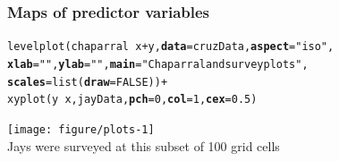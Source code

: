 \documentclass[color=usenames,dvipsnames]{beamer}\usepackage[]{graphicx}\usepackage[]{color}
\makeatletter
\newcommand{\hlnum}[1]{\textcolor[rgb]{0.69,0.494,0}{#1}}%
\newcommand{\hlstr}[1]{\textcolor[rgb]{0.749,0.012,0.012}{#1}}%
\newcommand{\hlopt}[1]{\textcolor[rgb]{0,0,0}{#1}}%
\newcommand{\hlstd}[1]{\textcolor[rgb]{0,0,0}{#1}}%
\newcommand{\hlkwc}[1]{\textcolor[rgb]{0,0,0}{\textbf{#1}}}%
\newcommand{\hlkwd}[1]{\textcolor[rgb]{0.004,0.004,0.506}{#1}}%
\newenvironment{kframe}{%
 \def\at@end@of@kframe{}%
 \ifinner\ifhmode%
  \def\at@end@of@kframe{\end{minipage}}%
  \begin{minipage}{\columnwidth}%
 \fi\fi%
 \def\FrameCommand##1{\hskip\@totalleftmargin \hskip-\fboxsep
 \colorbox{shadecolor}{##1}\hskip-\fboxsep
     \hskip-\linewidth \hskip-\@totalleftmargin \hskip\columnwidth}%
 \MakeFramed {\advance\hsize-\width
   \@totalleftmargin\z@ \linewidth\hsize
   \@setminipage}}%
 {\par\unskip\endMakeFramed%
 \at@end@of@kframe}
\newenvironment{knitrout}{}{} %
\makeatother
\begin{document}
\begin{frame}[fragile]
  \frametitle{Maps of predictor variables}
\begin{knitrout}\scriptsize
{}\color{fgcolor}\begin{kframe}
\begin{alltt}
\hlkwd{levelplot}\hlstd{(chaparral} \hlopt{~} \hlstd{x} \hlopt{+} \hlstd{y,} \hlkwc{data}\hlstd{=cruzData,} \hlkwc{aspect}\hlstd{=}\hlstr{"iso"}\hlstd{,}
          \hlkwc{xlab}\hlstd{=}\hlstr{""}\hlstd{,} \hlkwc{ylab}\hlstd{=}\hlstr{""}\hlstd{,} \hlkwc{main}\hlstd{=}\hlstr{"Chaparral and survey plots"}\hlstd{,}
          \hlkwc{scales}\hlstd{=}\hlkwd{list}\hlstd{(}\hlkwc{draw}\hlstd{=}\hlnum{FALSE}\hlstd{))} \hlopt{+}
    \hlkwd{xyplot}\hlstd{(y} \hlopt{~} \hlstd{x, jayData,} \hlkwc{pch}\hlstd{=}\hlnum{0}\hlstd{,} \hlkwc{col}\hlstd{=}\hlnum{1}\hlstd{,} \hlkwc{cex}\hlstd{=}\hlnum{0.5}\hlstd{)}
\end{alltt}
\end{kframe}
\end{knitrout}
\footnotesize
\centering
\texttt{[image: figure/plots-1]} \\
Jays were surveyed at this subset of 100 grid cells \\
\end{frame}
\end{document}
